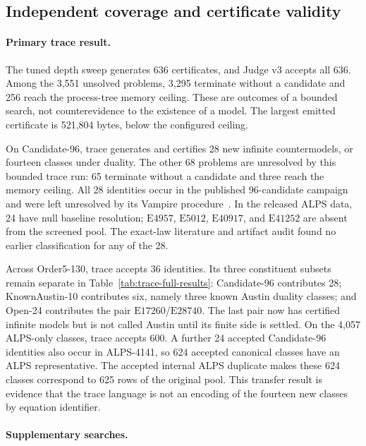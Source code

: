 \documentclass[runningheads]{llncs}
\newcommand{\Law}[1]{\ensuremath{\mathrm{E}#1}}
\begin{document}
\subsection{Independent coverage and certificate validity}

\paragraph{Primary trace result.}


The tuned depth sweep generates 636 certificates, and Judge v3 accepts all
636.  Among the 3,551 unsolved problems, 3,295 terminate without a candidate
and 256 reach the process-tree memory ceiling.  These are outcomes of a bounded
search, not counterevidence to the existence of a model.  The largest emitted
certificate is 521,804 bytes, below the configured ceiling.

On Candidate-96, trace generates and certifies 28 new infinite countermodels, or
fourteen classes under duality.  The other 68 problems are unresolved by this
bounded trace run: 65 terminate without a candidate and three reach the memory
ceiling.  All 28 identities occur in the published 96-candidate campaign and
were left unresolved by its Vampire procedure~\cite{ETPOrder5Austin}.  In the
released ALPS data, 24 have null baseline resolution; \Law{4957}, \Law{5012},
\Law{40917}, and \Law{41252} are absent from the screened pool.  The exact-law
literature and artifact audit found no earlier classification for any of the
28.

Across Order5-130, trace accepts 36 identities.  Its three constituent subsets
remain separate in Table~\ref{tab:trace-full-results}: Candidate-96 contributes
28; KnownAustin-10 contributes six, namely three known Austin duality classes;
and Open-24 contributes the pair \Law{17260}/\Law{28740}.  The last pair now
has certified infinite models but is not called Austin until its finite side is
settled.  On the 4,057 ALPS-only classes, trace accepts 600.  A further 24
accepted Candidate-96 identities also occur in ALPS-4141, so 624 accepted
canonical classes have an ALPS representative.  The accepted internal ALPS
duplicate makes these 624 classes correspond to 625 rows of the original pool.
This transfer result is evidence that the trace language is not an encoding of
the fourteen new classes by equation identifier.

\paragraph{Supplementary searches.}

\end{document}
